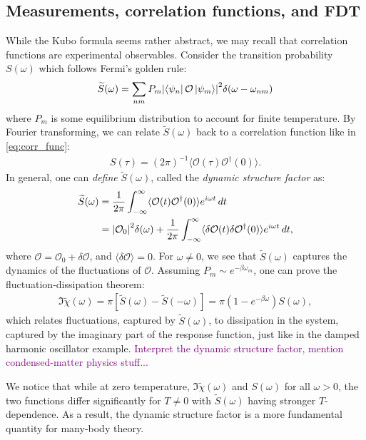\documentclass[reprint,
nofootinbib,
amsmath,amssymb,
aps]{revtex4-1}
\newcommand{\be}{\beta}
\newcommand{\f}[2]{\frac{#1}{#2}}
\begin{document}
\subsection{Measurements, correlation functions, and FDT}
While the Kubo formula seems rather abstract, we may recall that correlation functions are experimental observables. Consider the transition probability $S(\omega)$ which follows Fermi's golden rule:
\begin{align*}
\widetilde{S}(\omega) = \sum_{nm} P_m \abs{ \bra{\psi_n} \mathcal{O} \ket{\psi_m}  }^2  \delta(\omega - \omega_{nm}) 
\end{align*}
where $P_m$ is some equilibrium distribution to account for finite temperature. By Fourier transforming, we can relate $\widetilde{S}(\omega)$ back to a correlation function like in \eqref{eq:corr_func}:
\begin{align*}
S(\tau) = (2\pi)^{-1}\langle \mathcal{O}(\tau) \mathcal{O}^\dagger(0) \rangle. 
\end{align*}
In general, one can \textit{define} $\widetilde{S}(\omega)$, called the \textit{dynamic structure factor} as:
\begin{align*}
\widetilde{S}(\omega) 
&= \f{1}{2\pi}\int_{-\infty}^\infty \langle \mathcal{O}(t) \mathcal{O}^\dagger (0) \rangle e^{i \omega t }\,dt\\
&= \abs{\mathcal{O}_0}^2 \delta(\omega) + \f{1}{2\pi} \int_{-\infty}^\infty \langle \delta \mathcal{O}(t) \delta \mathcal{O}^\dagger (0) \rangle e^{i\omega t }\,dt,
\end{align*}
where $ \mathcal{O} = \mathcal{O}_0 + \delta \mathcal{O}$, and $\langle \delta \mathcal{O} \rangle = 0$. For $ \omega \neq 0$, we see that $\widetilde{S}(\omega)$ captures the dynamics of the fluctuations of $\mathcal{O}$. Assuming $P_m \sim e^{-\be \omega_m}$, one can prove the fluctuation-dissipation theorem:
\begin{align*}
\Im \widetilde{\chi}(\omega) = \pi[\widetilde{S}(\omega) - \widetilde{S}(-\omega)] = \pi (1 - e^{-\be \omega}) S(\omega),
\end{align*}
which relates fluctuations, captured by $\widetilde{S}(\omega)$, to dissipation in the system, captured by the imaginary part of the response function, just like in the damped harmonic oscillator example. \textcolor{purple}{Interpret the dynamic structure factor, mention condensed-matter physics stuff...}

We notice that while at zero temperature, $\Im \widetilde{\chi}(\omega)$ and $S(\omega)$ for all $\omega >0$, the two functions differ significantly for $T \neq 0$ with $\widetilde{S}(\omega)$ having stronger $T$-dependence. As a result, the dynamic structure factor is a more fundamental quantity for many-body theory. 
\end{document}
